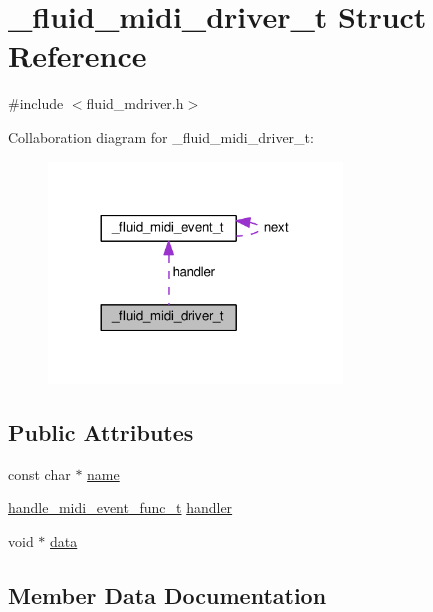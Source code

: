 \hypertarget{struct__fluid__midi__driver__t}{}\section{\+\_\+fluid\+\_\+midi\+\_\+driver\+\_\+t Struct Reference}
\label{struct__fluid__midi__driver__t}


{\ttfamily \#include $<$fluid\+\_\+mdriver.\+h$>$}



Collaboration diagram for \+\_\+fluid\+\_\+midi\+\_\+driver\+\_\+t\+:
\nopagebreak
\begin{figure}[H]
\begin{center}
\leavevmode
\includegraphics[width=221pt]{struct__fluid__midi__driver__t__coll__graph}
\end{center}
\end{figure}
\subsection*{Public Attributes}
\begin{DoxyCompactItemize}
\item 
const char $\ast$ \hyperlink{struct__fluid__midi__driver__t_a8fed06378561925282de8b1da4b48df6}{name}
\item 
\hyperlink{midi_8h_a42c3752e3adb54e0af802131c36a1129}{handle\+\_\+midi\+\_\+event\+\_\+func\+\_\+t} \hyperlink{struct__fluid__midi__driver__t_a765f3fddfd189bdeb58515bd8eebf553}{handler}
\item 
void $\ast$ \hyperlink{struct__fluid__midi__driver__t_aa94c33c717f0ca513ac839242a80a5b0}{data}
\end{DoxyCompactItemize}


\subsection{Member Data Documentation}
\mbox{\label{struct__fluid__midi__driver__t_aa94c33c717f0ca513ac839242a80a5b0}} 
